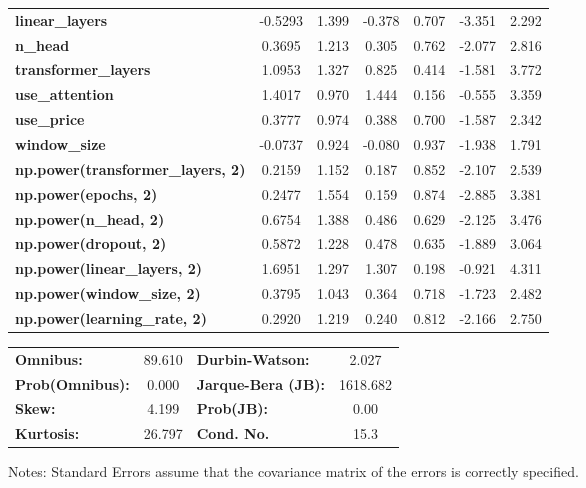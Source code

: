 \begin{center}
\begin{tabular}{lcccccc}
\textbf{linear\_layers}                   &      -0.5293  &        1.399     &    -0.378  &         0.707        &       -3.351    &        2.292     \\
\textbf{n\_head}                          &       0.3695  &        1.213     &     0.305  &         0.762        &       -2.077    &        2.816     \\
\textbf{transformer\_layers}              &       1.0953  &        1.327     &     0.825  &         0.414        &       -1.581    &        3.772     \\
\textbf{use\_attention}                   &       1.4017  &        0.970     &     1.444  &         0.156        &       -0.555    &        3.359     \\
\textbf{use\_price}                       &       0.3777  &        0.974     &     0.388  &         0.700        &       -1.587    &        2.342     \\
\textbf{window\_size}                     &      -0.0737  &        0.924     &    -0.080  &         0.937        &       -1.938    &        1.791     \\
\textbf{np.power(transformer\_layers, 2)} &       0.2159  &        1.152     &     0.187  &         0.852        &       -2.107    &        2.539     \\
\textbf{np.power(epochs, 2)}              &       0.2477  &        1.554     &     0.159  &         0.874        &       -2.885    &        3.381     \\
\textbf{np.power(n\_head, 2)}             &       0.6754  &        1.388     &     0.486  &         0.629        &       -2.125    &        3.476     \\
\textbf{np.power(dropout, 2)}             &       0.5872  &        1.228     &     0.478  &         0.635        &       -1.889    &        3.064     \\
\textbf{np.power(linear\_layers, 2)}      &       1.6951  &        1.297     &     1.307  &         0.198        &       -0.921    &        4.311     \\
\textbf{np.power(window\_size, 2)}        &       0.3795  &        1.043     &     0.364  &         0.718        &       -1.723    &        2.482     \\
\textbf{np.power(learning\_rate, 2)}      &       0.2920  &        1.219     &     0.240  &         0.812        &       -2.166    &        2.750     \\
\bottomrule
\end{tabular}
\begin{tabular}{lclc}
\textbf{Omnibus:}       & 89.610 & \textbf{  Durbin-Watson:     } &    2.027  \\
\textbf{Prob(Omnibus):} &  0.000 & \textbf{  Jarque-Bera (JB):  } & 1618.682  \\
\textbf{Skew:}          &  4.199 & \textbf{  Prob(JB):          } &     0.00  \\
\textbf{Kurtosis:}      & 26.797 & \textbf{  Cond. No.          } &     15.3  \\
\bottomrule
\end{tabular}
\end{center}

Notes: \newline
 [1] Standard Errors assume that the covariance matrix of the errors is correctly specified.